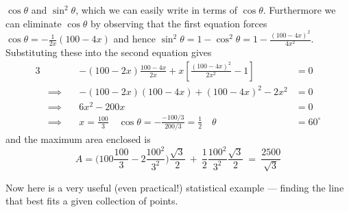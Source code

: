 \begin{eg}
$\cos\theta$ and $\sin^2\theta$, which we can easily write in terms
of $\cos\theta$. Furthermore we can eliminate $\cos\theta$ by observing 
that the first equation forces $\cos\theta=-\frac{1}{2x}(100-4x)$
and hence $\sin^2\theta=1-\cos^2\theta=1-\frac{(100-4x)^2}{4x^2}$. 
Substituting these into the second equation gives
\begin{alignat*}{3}
& & -(100-2x)\frac{100-4x}{2x}+x\left[\frac{(100-4x)^2}{2x^2}-1\right]&=0 \\[0.1in]
&\implies\quad & -(100-2x)(100-4x)+(100-4x)^2-2x^2&=0 \\[0.1in]
&\implies & 6x^2-200x&=0 \\[0.1in]
&\implies & x=\frac{100}{3}
\quad\cos\theta=-\frac{-100/3}{200/3}=\frac{1}{2}\quad
\theta&=60^\circ
\end{alignat*}
and the maximum area enclosed is
\begin{equation*}
A= \Big(100\frac{100}{3}-2\frac{100^2}{3^2}\Big)\frac{\sqrt{3}}{2}
           \ +\ \frac{1}{2} \frac{100^2}{3^2}\frac{\sqrt{3}}{2}
\ =\ \frac{2500}{\sqrt{3}}
\end{equation*}
\end{eg}

Now here is a very useful (even practical!) statistical example --- finding 
the line that best fits a given collection of points.

